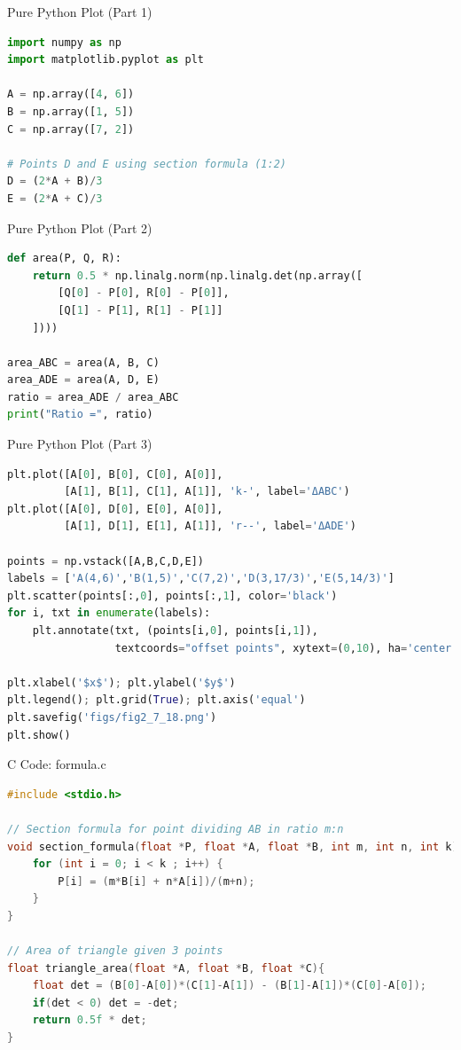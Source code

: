 \documentclass{beamer}
\begin{document}
\begin{frame}[fragile]{Pure Python Plot (Part 1)}
\begin{lstlisting}[language=Python]
import numpy as np
import matplotlib.pyplot as plt

A = np.array([4, 6])
B = np.array([1, 5])
C = np.array([7, 2])

# Points D and E using section formula (1:2)
D = (2*A + B)/3
E = (2*A + C)/3
\end{lstlisting}
\end{frame}

\begin{frame}[fragile]{Pure Python Plot (Part 2)}
\begin{lstlisting}[language=Python]
def area(P, Q, R):
    return 0.5 * np.linalg.norm(np.linalg.det(np.array([
        [Q[0] - P[0], R[0] - P[0]],
        [Q[1] - P[1], R[1] - P[1]]
    ])))

area_ABC = area(A, B, C)
area_ADE = area(A, D, E)
ratio = area_ADE / area_ABC
print("Ratio =", ratio)
\end{lstlisting}
\end{frame}

\begin{frame}[fragile]{Pure Python Plot (Part 3)}
\begin{lstlisting}[language=Python]
plt.plot([A[0], B[0], C[0], A[0]],
         [A[1], B[1], C[1], A[1]], 'k-', label='ΔABC')
plt.plot([A[0], D[0], E[0], A[0]],
         [A[1], D[1], E[1], A[1]], 'r--', label='ΔADE')

points = np.vstack([A,B,C,D,E])
labels = ['A(4,6)','B(1,5)','C(7,2)','D(3,17/3)','E(5,14/3)']
plt.scatter(points[:,0], points[:,1], color='black')
for i, txt in enumerate(labels):
    plt.annotate(txt, (points[i,0], points[i,1]),
                 textcoords="offset points", xytext=(0,10), ha='center')

plt.xlabel('$x$'); plt.ylabel('$y$')
plt.legend(); plt.grid(True); plt.axis('equal')
plt.savefig('figs/fig2_7_18.png')
plt.show()
\end{lstlisting}
\end{frame}

\begin{frame}[fragile]{C Code: formula.c}
\begin{lstlisting}[language=C]
#include <stdio.h>

// Section formula for point dividing AB in ratio m:n
void section_formula(float *P, float *A, float *B, int m, int n, int k){
    for (int i = 0; i < k ; i++) {
        P[i] = (m*B[i] + n*A[i])/(m+n);
    }
}

// Area of triangle given 3 points
float triangle_area(float *A, float *B, float *C){
    float det = (B[0]-A[0])*(C[1]-A[1]) - (B[1]-A[1])*(C[0]-A[0]);
    if(det < 0) det = -det;
    return 0.5f * det;
}
\end{lstlisting}
\end{frame}
\end{document}
